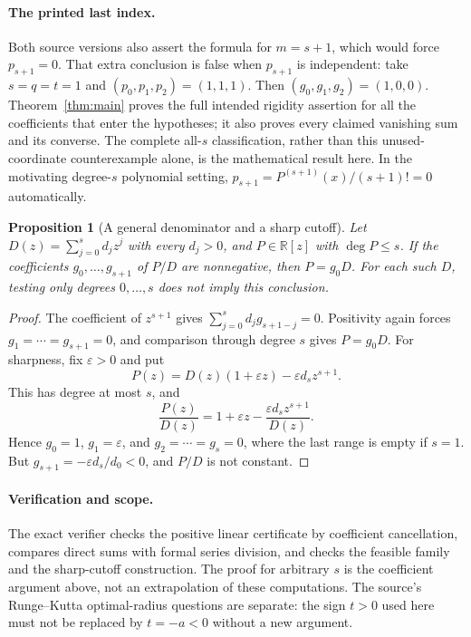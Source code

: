 \documentclass[11pt]{article}
\newtheorem{proposition}{Proposition}
\begin{document}
\paragraph{The printed last index.}
Both source versions also assert the formula for $m=s+1$,
which would force $p_{s+1}=0$. That extra conclusion is false
when $p_{s+1}$ is independent: take $s=q=t=1$ and
$(p_0,p_1,p_2)=(1,1,1)$. Then $(g_0,g_1,g_2)=(1,0,0)$.
Theorem~\ref{thm:main} proves the full intended rigidity assertion
for all the coefficients that enter the hypotheses; it also proves
every claimed vanishing sum and its converse. The complete
all-$s$ classification, rather than this unused-coordinate
counterexample alone, is the mathematical result here.
In the motivating degree-$s$ polynomial setting,
$p_{s+1}=P^{(s+1)}(x)/(s+1)!=0$ automatically.

\begin{proposition}[A general denominator and a sharp cutoff]
Let $D(z)=\sum_{j=0}^s d_jz^j$ with every $d_j>0$, and
$P\in\mathbb R[z]$ with $\deg P\le s$.
If the coefficients $g_0,\ldots,g_{s+1}$ of $P/D$ are nonnegative,
then $P=g_0D$. For each such $D$, testing only degrees
$0,\ldots,s$ does not imply this conclusion.
\end{proposition}
\begin{proof}
The coefficient of $z^{s+1}$ gives
$\sum_{j=0}^s d_jg_{s+1-j}=0$. Positivity again forces
$g_1=\cdots=g_{s+1}=0$, and comparison through degree $s$
gives $P=g_0D$.
For sharpness, fix $\varepsilon>0$ and put
\[
 P(z)=D(z)(1+\varepsilon z)-\varepsilon d_sz^{s+1}.
\]
This has degree at most $s$, and
\[
 \frac{P(z)}{D(z)}=1+\varepsilon z
           -\frac{\varepsilon d_sz^{s+1}}{D(z)}.
\]
Hence $g_0=1$, $g_1=\varepsilon$, and $g_2=\cdots=g_s=0$,
where the last range is empty if $s=1$. But
$g_{s+1}=-\varepsilon d_s/d_0<0$, and $P/D$ is not constant.
\end{proof}

\paragraph{Verification and scope.}
The exact verifier checks the positive linear certificate by
coefficient cancellation, compares direct sums with formal series
division, and checks the feasible family and the sharp-cutoff
construction. The proof for arbitrary $s$ is the coefficient
argument above, not an extrapolation of these computations.
The source's Runge--Kutta optimal-radius questions are separate:
the sign $t>0$ used here must not be replaced by $t=-a<0$
without a new argument.
\end{document}
